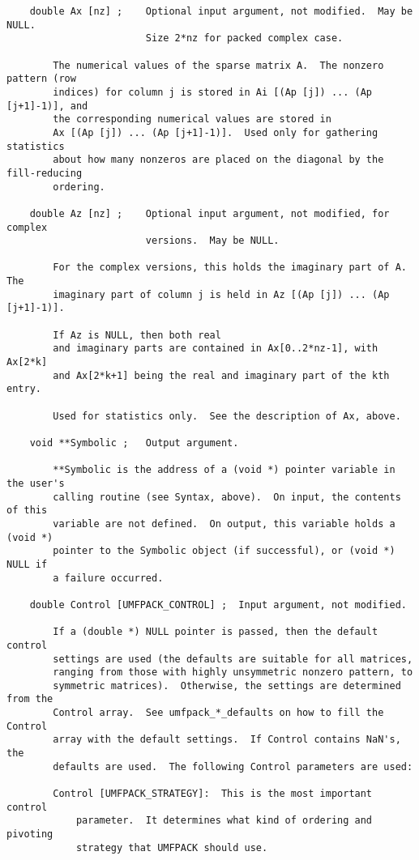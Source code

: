 \documentclass[11pt]{article}
\begin{document}
{\begin{verbatim}
    double Ax [nz] ;    Optional input argument, not modified.  May be NULL.
                        Size 2*nz for packed complex case.

        The numerical values of the sparse matrix A.  The nonzero pattern (row
        indices) for column j is stored in Ai [(Ap [j]) ... (Ap [j+1]-1)], and
        the corresponding numerical values are stored in
        Ax [(Ap [j]) ... (Ap [j+1]-1)].  Used only for gathering statistics
        about how many nonzeros are placed on the diagonal by the fill-reducing
        ordering.

    double Az [nz] ;    Optional input argument, not modified, for complex
                        versions.  May be NULL.

        For the complex versions, this holds the imaginary part of A.  The
        imaginary part of column j is held in Az [(Ap [j]) ... (Ap [j+1]-1)].

        If Az is NULL, then both real
        and imaginary parts are contained in Ax[0..2*nz-1], with Ax[2*k]
        and Ax[2*k+1] being the real and imaginary part of the kth entry.

        Used for statistics only.  See the description of Ax, above.

    void **Symbolic ;   Output argument.

        **Symbolic is the address of a (void *) pointer variable in the user's
        calling routine (see Syntax, above).  On input, the contents of this
        variable are not defined.  On output, this variable holds a (void *)
        pointer to the Symbolic object (if successful), or (void *) NULL if
        a failure occurred.

    double Control [UMFPACK_CONTROL] ;  Input argument, not modified.

        If a (double *) NULL pointer is passed, then the default control
        settings are used (the defaults are suitable for all matrices,
        ranging from those with highly unsymmetric nonzero pattern, to
        symmetric matrices).  Otherwise, the settings are determined from the
        Control array.  See umfpack_*_defaults on how to fill the Control
        array with the default settings.  If Control contains NaN's, the
        defaults are used.  The following Control parameters are used:

        Control [UMFPACK_STRATEGY]:  This is the most important control
            parameter.  It determines what kind of ordering and pivoting
            strategy that UMFPACK should use.


\end{verbatim}}
\end{document}
